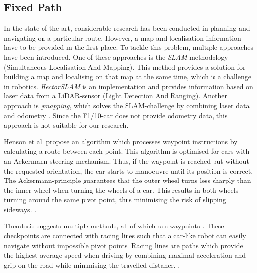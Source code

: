 \documentclass[conference,a4paper]{IEEEtran}
\begin{document}
\subsection{Fixed Path}
In the state-of-the-art, considerable research has been conducted in planning and navigating on a particular route. However, a map and localisation information have to be provided in the first place. To tackle this problem, multiple approaches have been introduced. One of these approaches is the \emph{SLAM}-methodology (Simultaneous Localisation And Mapping). This method provides a solution for building a map and localising on that map at the same time, which is a challenge in robotics. \emph{Hector\textunderscore SLAM} is an implementation and provides information based on laser data from a LiDAR-sensor (Light Detection And Ranging)\cite{Kohlbrecher2011, Kohlbrecher2012}. Another approach is \emph{gmapping}, which solves the SLAM-challenge by combining laser data and odometry \cite{Grisetti2007}. Since the F1/10-car does not provide odometry data, this approach is not suitable for our research.

Henson et al. \cite{Henson2008} propose an algorithm which processes waypoint instructions by calculating a route between each point. This algorithm is optimised for cars with an Ackermann-steering mechanism. Thus, if the waypoint is reached but without the requested orientation, the car starts to manoeuvre until its position is correct. The Ackermann-principle guarantees that the outer wheel turns less sharply than the inner wheel when turning the wheels of a car. This results in both wheels turning around the same pivot point, thus minimising the risk of slipping sideways. \cite{King-Hele2002}. 

Theodosis suggests multiple methods, all of which use waypoints \cite{Theodosis2014}. These checkpoints are connected with racing lines such that a car-like robot can easily navigate without impossible pivot points. Racing lines are paths which provide the highest average speed when driving by combining maximal acceleration and grip on the road while minimising the travelled distance. \cite{Macfarland2015}.
\end{document}
